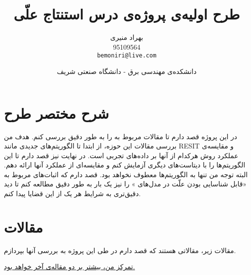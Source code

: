 \documentclass{article}
\title{طرح اولیه‌ی پروژه‌ی درس استنتاج علّی\\
\vspace{0.5cm}
\textbf{\lr{A Review on Additive Noise Models:\\ Theorems and Learning Algorithms}}
}
\author{بهراد منیری\\95109564\\ \texttt{bemoniri@live.com}}
\date{دانشکده‌ی مهندسی برق - دانشگاه صنعتی شریف}
\begin{document}
\maketitle
\section{شرح مختصر طرح}
\noindent
در این پروژه قصد دارم تا  مقالات مربوط به 
را به طور دقیق بررسی کنم. هدف من بررسی مقالات این حوزه، از ابتدا تا الگوریتم‌های جدیدی مانند RESIT و مقایسه‌ی  عملکرد  روش‌ هرکدام از آنها بر داده‌های تجربی است. در نهایت نیز قصد دارم تا این الگوریتم‌ها را  با دیتاست‌های دیگری آزمایش کنم و  مقایسه‌ای از عملکرد آنها ارائه دهم.
 البته توجه من تنها به الگوریتم‌ها معطوف نخواهد بود.  قصد دارم که اثبات‌های مربوط به «قابل شناسایی بودن علّت در مدل‌های
»
را نیز یک بار به طور دقیق مطالعه کنم تا دید دقیق‌تری به شرایط  هر یک از این قضایا پیدا کنم.

\indent
\section{مقالات}
	مقالات زیر، مقالاتی هستند که قصد دارم در طی این پروژه به بررسی آنها بپردازم.

\underline{تمرکز من، بیشتر بر دو مقاله‌ی آخر خواهد بود.}
\end{document}
